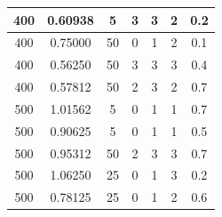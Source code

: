 \documentclass[12pt]{report}
\begin{document}
\begin{table}[h]
\begin{tabular}{ | c | c | c | c | c | c | c |}
		400 & 0.60938 & 5 & 3 & 3 & 2 & 0.2 \\ \hline
		400 & 0.75000 & 50 & 0 & 1 & 2 & 0.1 \\ \hline
		400 & 0.56250 & 50 & 3 & 3 & 3 & 0.4 \\ \hline
		400 & 0.57812 & 50 & 2 & 3 & 2 & 0.7 \\ \hline
		500 & 1.01562 & 5 & 0 & 1 & 1 & 0.7 \\ \hline
		500 & 0.90625 & 5 & 0 & 1 & 1 & 0.5 \\ \hline
		500 & 0.95312 & 50 & 2 & 3 & 3 & 0.7 \\ \hline
		500 & 1.06250 & 25 & 0 & 1 & 3 & 0.2 \\ \hline
		500 & 0.78125 & 25 & 0 & 1 & 2 & 0.6 \\ \hline
		
	\end{tabular}
\end{table}
\end{document}
